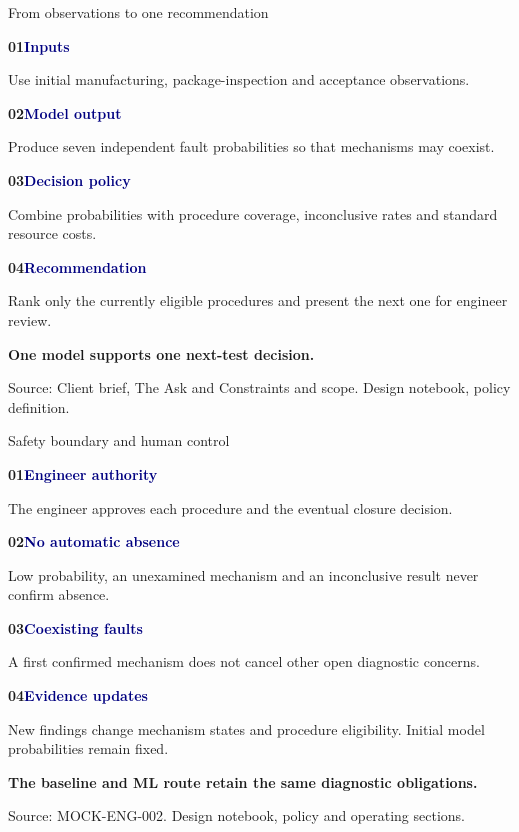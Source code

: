 \documentclass[aspectratio=169,10pt]{beamer}
\newcommand{\source}[1]{\vfill{\fontsize{6.2}{7.5}\selectfont\color{Muted}Source: #1\par}}
\newcommand{\seqitem}[3]{%
  {\normalsize\bfseries\color{Teal}#1\quad\textcolor{Navy}{#2}}\par
  \vspace{0.6mm}
  {\small #3}\par}
\newcommand{\seqrule}{%
  \vspace{1mm}{\color{RuleGrey}\rule{\textwidth}{0.45pt}}\vspace{1mm}}
\begin{document}
\begin{frame}[t]{From observations to one recommendation}
  \vspace{2mm}

  \seqitem{01}{Inputs}
    {Use initial manufacturing, package-inspection and acceptance observations.}

  \seqrule

  \seqitem{02}{Model output}
    {Produce seven independent fault probabilities so that mechanisms may coexist.}

  \seqrule

  \seqitem{03}{Decision policy}
    {Combine probabilities with procedure coverage, inconclusive rates and standard resource costs.}

  \seqrule

  \seqitem{04}{Recommendation}
    {Rank only the currently eligible procedures and present the next one for engineer review.}

  \vspace{3mm}
  {\small\bfseries\color{Amber}One model supports one next-test decision.}

  \source{Client brief, The Ask and Constraints and scope. Design notebook, policy definition.}
\end{frame}

\begin{frame}[t]{Safety boundary and human control}
  \vspace{2mm}

  \seqitem{01}{Engineer authority}
    {The engineer approves each procedure and the eventual closure decision.}

  \seqrule

  \seqitem{02}{No automatic absence}
    {Low probability, an unexamined mechanism and an inconclusive result never confirm absence.}

  \seqrule

  \seqitem{03}{Coexisting faults}
    {A first confirmed mechanism does not cancel other open diagnostic concerns.}

  \seqrule

  \seqitem{04}{Evidence updates}
    {New findings change mechanism states and procedure eligibility. Initial model probabilities remain fixed.}

  \vspace{3mm}
  {\small\bfseries\color{Amber}The baseline and ML route retain the same diagnostic obligations.}

  \source{MOCK-ENG-002. Design notebook, policy and operating sections.}
\end{frame}
\end{document}
